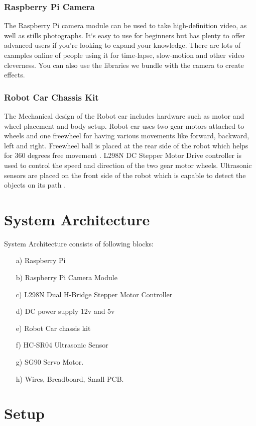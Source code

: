 \documentclass[sigconf]{acmart}
\begin{document}
\subsubsection{Raspberry Pi Camera}
The Raspberry Pi camera module can be used to take high-definition video, as well as 
stills photographs. It`s easy to use for beginners but has plenty to offer advanced
users if you’re looking to expand your knowledge. There are lots of examples online 
of people using it for time-lapse, slow-motion and other video cleverness. You can 
also use the libraries we bundle with the camera to create effects.

\subsubsection{Robot Car Chassis Kit}
The Mechanical design of the Robot car includes hardware such as motor and wheel placement
and body setup. Robot car uses two gear-motors attached to wheels and one freewheel 
for having various movements like forward, backward, left and right. Freewheel ball 
is placed at the rear side of the robot which helps for 360 degrees free movement 
\cite{arduino2015}. L298N DC Stepper Motor Drive controller is used to control the 
speed and direction of the two gear motor wheels. Ultrasonic sensors are placed on 
the front side of the robot which is capable to detect the objects on its path \cite{gregor2017}.



\section{System Architecture}
System Architecture consists of following blocks:

\begin{itemize}
\item[a)] Raspberry Pi
\item[b)] Raspberry Pi Camera Module
\item[c)] L298N Dual H-Bridge Stepper Motor Controller
\item[d)] DC power supply 12v and 5v
\item[e)] Robot Car chassis kit
\item[f)] HC-SR04 Ultrasonic Sensor
\item[g)] SG90 Servo Motor.
\item[h)] Wires, Breadboard, Small PCB.
\end{itemize}


\section{Setup}
\end{document}
